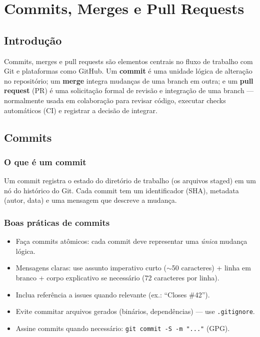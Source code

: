 \chapter{Commits, Merges e Pull Requests}

\section{Introdução}
Commits, merges e pull requests são elementos centrais no fluxo de trabalho com Git e plataformas como GitHub.  
Um \textbf{commit} é uma unidade lógica de alteração no repositório; um \textbf{merge} integra mudanças de uma branch em outra; e um \textbf{pull request} (PR) é uma solicitação formal de revisão e integração de uma branch — normalmente usada em colaboração para revisar código, executar checks automáticos (CI) e registrar a decisão de integrar.

\section{Commits}

\subsection{O que é um commit}
Um commit registra o estado do diretório de trabalho (os arquivos staged) em um nó do histórico do Git. Cada commit tem um identificador (SHA), metadata (autor, data) e uma mensagem que descreve a mudança.

\subsection{Boas práticas de commits}
\begin{itemize}
  \item Faça commits atômicos: cada commit deve representar uma \emph{única} mudança lógica.  
  \item Mensagens claras: use assunto imperativo curto (\(\sim\)50 caracteres) + linha em branco + corpo explicativo se necessário (72 caracteres por linha).  
  \item Inclua referência a issues quando relevante (ex.: ``Closes \#42'').  
  \item Evite commitar arquivos gerados (binários, dependências) — use \texttt{.gitignore}.  
  \item Assine commits quando necessário: \texttt{git commit -S -m "..."} (GPG).
\end{itemize}

